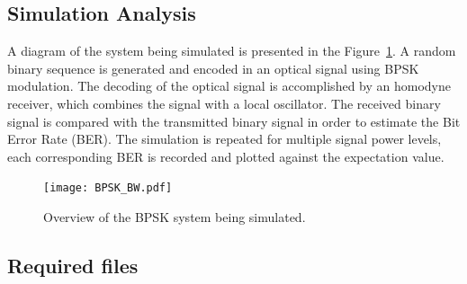 \subsection{Simulation Analysis}

A diagram of the system being simulated is presented in the Figure~\ref{fig:homodynesystem}. A random binary sequence is generated and encoded in an optical signal using BPSK modulation. The decoding of the optical signal is accomplished by an homodyne receiver, which combines the signal with a local oscillator. The received binary signal is compared with the transmitted binary signal in order to estimate the Bit Error Rate (BER). The simulation is repeated for multiple signal power levels, each corresponding BER is recorded and plotted against the expectation value.

\begin{figure}[h]
\centering
\texttt{[image: BPSK\_BW.pdf]}
\caption{Overview of the BPSK system being simulated.}
\label{fig:homodynesystem}
\end{figure}

\subsection*{Required files}\label{Required files}

